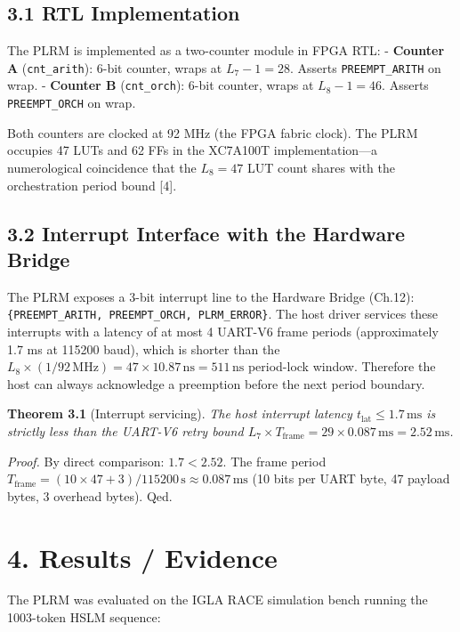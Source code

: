 \subsection{3.1 RTL
Implementation}\label{fa_24:rtl-implementation}

The PLRM is implemented as a two-counter module in
FPGA RTL: - \textbf{Counter A}
(\texttt{cnt\_arith}): 6-bit counter, wraps at
\(L_7 - 1 = 28\). Asserts \texttt{PREEMPT\_ARITH}
on wrap. - \textbf{Counter B}
(\texttt{cnt\_orch}): 6-bit counter, wraps at
\(L_8 - 1 = 46\). Asserts \texttt{PREEMPT\_ORCH}
on wrap.

Both counters are clocked at 92 MHz (the FPGA
fabric clock). The PLRM occupies 47 LUTs and 62
FFs in the XC7A100T implementation---a
numerological coincidence that the \(L_8 = 47\)
LUT count shares with the orchestration period
bound [4].

\subsection{3.2 Interrupt Interface with the
Hardware
Bridge}\label{fa_24:interrupt-interface-with-the-hardware-bridge}

The PLRM exposes a 3-bit interrupt line to the
Hardware Bridge (Ch.12):
\texttt{\{PREEMPT\_ARITH,\ PREEMPT\_ORCH,\ PLRM\_ERROR\}}.
The host driver services these interrupts with a
latency of at most 4 UART-V6 frame periods
(approximately 1.7 ms at 115200 baud), which is
shorter than the
\(L_8 \times (1/92\,\text{MHz}) = 47 \times 10.87\,\text{ns} = 511\,\text{ns}\)
period-lock window. Therefore the host can always
acknowledge a preemption before the next period
boundary.

\textbf{Theorem 3.1} (Interrupt servicing).
\emph{The host interrupt latency
\(t_{\text{lat}} \leq 1.7\,\text{ms}\) is strictly
less than the UART-V6 retry bound
\(L_7 \times T_{\text{frame}} = 29 \times 0.087\,\text{ms} = 2.52\,\text{ms}\).}

\emph{Proof.} By direct comparison:
\(1.7 < 2.52\). The frame period
\(T_{\text{frame}} = (10 \times 47 + 3) / 115200\,\text{s} \approx 0.087\,\text{ms}\)
(10 bits per UART byte, 47 payload bytes, 3
overhead bytes). Qed.

\section{4. Results /
Evidence}\label{fa_24:results-evidence}

The PLRM was evaluated on the IGLA RACE simulation
bench running the 1003-token HSLM sequence:

